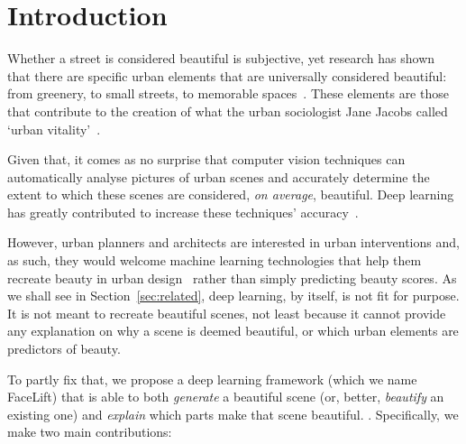 \section{Introduction}


Whether a street is considered beautiful is subjective, yet research has shown that there are specific urban elements that are universally considered beautiful: from greenery, to small streets, to memorable spaces~\cite{alexander1977pattern, quercia2014aesthetic,salesses2013collaborative}. These elements are those that contribute to the creation of what the urban sociologist Jane Jacobs called `urban vitality'~\cite{jacobs1961death}. 


Given that, it comes as no surprise that computer vision techniques can automatically analyse pictures of urban scenes and accurately determine the extent to which these scenes are considered, \emph{on average}, beautiful.  Deep learning has greatly contributed to increase these techniques' accuracy~\cite{dubey2016deep}.

However, urban planners and architects are interested in urban interventions and, as such, they
would welcome machine learning technologies that help them recreate beauty in urban design~\cite{de2008architecture} rather than simply predicting beauty scores. As we shall see in Section~\ref{sec:related}, deep learning, by itself, is not fit for purpose. It is not meant to recreate beautiful scenes, not least because it cannot provide any explanation on why a scene is deemed beautiful, or which urban elements are predictors of beauty.


To partly fix that, we propose a deep learning framework (which we name  FaceLift) that is able to both \emph{generate} a beautiful scene (or, better, \emph{beautify} an existing one) and \emph{explain} which parts make that scene beautiful. . Specifically, we make two main contributions:

